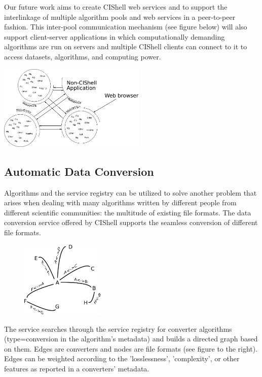 Our future work aims to create CIShell web services and to support the 
interlinkage of multiple algorithm pools and web services in a peer-to-peer 
fashion. This inter-pool communication mechanism (see figure below) will also 
support client-server applications in which computationally demanding 
algorithms are run on servers and multiple CIShell clients can connect to it to 
access datasets, algorithms, and computing power.

\begin{center}
\includegraphics[width=70mm]{graphics/connectingPools.png}
\end{center}

\subsection{Automatic Data Conversion}

Algorithms and the service registry can be utilized to solve another problem 
that arises when dealing with many algorithms written by different people from 
different scientific communities: the multitude of existing file formats. The 
data conversion service offered by CIShell supports the seamless conversion of 
different file formats.

\begin{figure} 
\includegraphics[width=40mm,clip=true]{graphics/conversionGraph.png}
\end{figure}

The service searches through the service registry for converter algorithms 
(type=conversion in the algorithm's metadata) and builds a directed graph based 
on them. Edges are converters and nodes are file formats (see figure
to the right). Edges can be weighted according to the 'losslessness', 
'complexity', or other features as reported in a converters' metadata.

